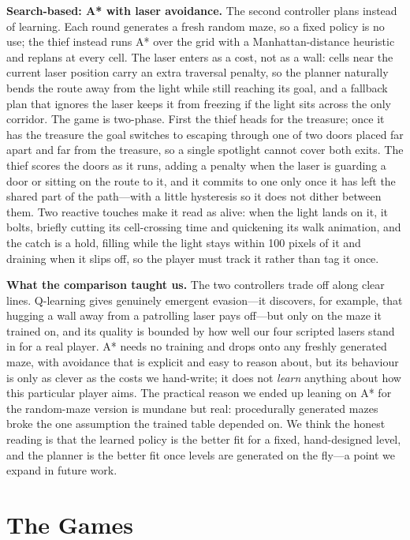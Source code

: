 \documentclass[conference]{IEEEtran}
\begin{document}
\noindent\textbf{Search-based: A* with laser avoidance.} The second controller
plans instead of learning. Each round generates a fresh random maze, so a fixed
policy is no use; the thief instead runs A* over the grid with a Manhattan-distance
heuristic~\cite{hart1968} and replans at every cell. The laser enters as a cost,
not as a wall: cells near the current laser position carry an extra traversal
penalty, so the planner naturally bends the route away from the light while still
reaching its goal, and a fallback plan that ignores the laser keeps it from
freezing if the light sits across the only corridor. The game is two-phase. First
the thief heads for the treasure; once it has the treasure the goal switches to
escaping through one of two doors placed far apart and far from the treasure, so a
single spotlight cannot cover both exits. The thief scores the doors as it runs,
adding a penalty when the laser is guarding a door or sitting on the route to it,
and it commits to one only once it has left the shared part of the path---with a
little hysteresis so it does not dither between them. Two reactive touches make it
read as alive: when the light lands on it, it bolts, briefly cutting its
cell-crossing time and quickening its walk animation, and the catch is a hold,
filling while the light stays within 100 pixels of it and draining when it slips
off, so the player must track it rather than tag it once.

\noindent\textbf{What the comparison taught us.} The two controllers trade off
along clear lines. Q-learning gives genuinely emergent evasion---it discovers, for
example, that hugging a wall away from a patrolling laser pays off---but only on
the maze it trained on, and its quality is bounded by how well our four scripted
lasers stand in for a real player. A* needs no training and drops onto any
freshly generated maze, with avoidance that is explicit and easy to reason about,
but its behaviour is only as clever as the costs we hand-write; it does not
\emph{learn} anything about how this particular player aims. The practical reason
we ended up leaning on A* for the random-maze version is mundane but real:
procedurally generated mazes broke the one assumption the trained table depended
on. We think the honest reading is that the learned policy is the better fit for a
fixed, hand-designed level, and the planner is the better fit once levels are
generated on the fly---a point we expand in future work.

\section{The Games}\label{sec:games}
\end{document}
